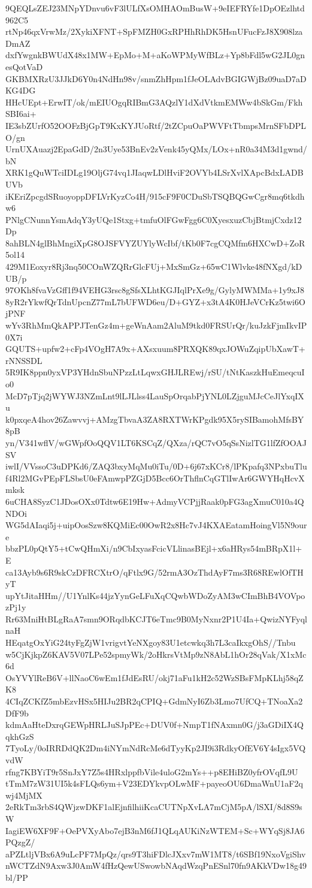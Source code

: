 9QEQLsZEJ23MNpYDnvu6vF3lULfXsOMHAOmBusW+9eIEFRYfe1DpOEzlhtd962C5
rtNp46qxVrwMz/2XykiXFNT+SpFMZH0GxRPHhRhDK5HsnUFucFzJ8X908lzaDmAZ
dxfYwgnkBWUdX48x1MW+EpMo+M+aKoWPMyWfBLz+Yp8bFdl5wG2JL0gnesQotVaD
GKBMXRzU3JJkD6Y0n4NdHn98v/snmZhHpm1fJeOLAdvBGIGWjBz09uaD7aDKG4DG
HHcUEpt+ErwIT/ok/mEIUOgqRIBmG3AQzlY1dXdVtkmEMWw4bSkGm/FkhSBI6ai+
IE3sbZUrfO52OOFzBjGpT9KxKYJUoRtf/2tZCpuOaPWVFtTbmpsMrnSFbDPLO/gn
UrnUXAuazj2EpaGdD/2n3Uye53BnEv2zVenk45yQMx/LOx+nR0a34M3d1gwnd/bN
XRK1gQuWTciIDLg19OljG74vq1JIaqwLDlHviF2OVYb4LSrXvlXApcBdxLADBUVb
iKEriZpcgdSRuoyoppDFLVrKyzCo4H/915cF9F0CDuSbTSQBQGwCgr8mq6tkdhw6
PNlgCNunnYsmAdqY3yUQe1Stxg+tmfuOlFGwFgg6C0XyesxuzCbjBtmjCxdz12Dp
8ahBLN4glBhMngiXpG8OJSFVYZUYlyWcIbf/tKb0F7cgCQMfm6HXCwD+ZoR5ol14
429M1Eoxyr8Rj3nq50COnWZQRrGlcFUj+MxSmGz+65wC1Wlvke48fNXgd/kDUB/p
97OKh8fvaVzGff1f94VEHG3rsc8gSfsXLhtKGJIqlPrXe9g/GylyMWMMa+1y9xJ8
8yR2rYkwfQrTdnUpcnZ77mL7bUFWD6eu/D+GYZ+x3tA4K0HJeVCrKz5twi6OjPNF
wYv3RhMmQkAPPJTenGz4m+geWnAam2AluM9tkd0FRSUrQr/kuJzkFjmIkvIP0X7i
GQUTS+upfw2+cFp4VOgH7A9x+AXsxuum8PRXQK89qxJOWuZqipUbXawT+rNNSSDL
5R9IK8ppn0yxVP3YHdnSbuNPzzLtLqwxGHJLREwj/rSU/tNtKaszkHuEmeqcuIo0
McD7pTjq2jWYWJ3NZmLnt9lLJLlss4LauSpOrqabPjYNL0LZjguMJcCeJlYxqIXu
k0pxqeA4hov26Zawvvj+AMzgTbvaA3ZA8RXTWrKPgdk95X5rySIBamohMfsBY8pB
yn/V341wflV/wGWpfOoQQV1LT6KSCqZ/QXza/rQC7vO5qSsNizlTG1lfZfOOAJSV
iwlI/VVssoC3uDPKd6/ZAQ3bxyMqMu0iTu/0D+6j67xKCr8/lPKpafq3NPxbuTlu
f4Rl2MGvPEpFLSbsU0eFAmwpPZGjD5Bcc6OrThflnCqGTlIwAr6GWYHqHcvXmksk
6uCHA8SyzC1JDosOXx0Tdtw6E19Hw+AdmyVCPjjRaak0pFG3agXmuC010a4QNDOi
WG5dAIaqi5j+uipOosSzw8KQMiEc00OwR2x8Hc7vJ4KXAEatamHoingVl5N9oure
bbzPL0pQtY5+tCwQHmXi/n9CbIxyasFcicVLlinasBEjl+x6aHRys54mBRpX1l+E
ca13Ayb9s6R9skCzDFRCXtrO/qFtlx9G/52rmA3OzThdAyF7ms3R68REwlOfTHyT
upYtJitaHHm//U1YnlKs44jzYynGeLFuXqCQwbWDoZyAM3wCImBhB4VOVpozPj1y
Rr63MniHtBLgRaA7smn9ORqdbKCJT6eTmc9B0MyNxnr2P1U4Ia+QwizNYFyqlnaH
HEqatgOxYiG24tyFgZjW1vrigvtYeNXgoy83U1etcwkq3h7L3caIkxgOhS//Tnbu
w5CjKjkpZ6KAV5V07LPe52spmyWk/2oHkrsVtMp9zN8AbL1hOr28qVak/X1xMc6d
OsYVYlReB6V+llNaoC6wEm1fJdEsRU/okj71aFu1kH2c52WzSBsFMpKLhj58qZK8
4CIqZCKfZ5mbEzvHSx5HIJu2BR2qCPIQ+GdmNyI6Zb3Lmo7UfCQ+TNoaXa2DfF9b
kdmAaHteDxrqGEWpHRLJuSJpPEc+DUV0f+NmpT1fNAxmn0G/j3aGDiIX4QqkhGzS
7TyoLy/0oIRRDdQK2Dm4iNYmNdRcMe6dTyyKp2JI9i3RdkyOfEV6Y4sIgx5VQvdW
rfng7KBYiT9r5SnJxY7Z5s4HRxlppfbVile4uloG2mYs++p8EHiBZ0yfrOVqfL9U
tTmM7zW31UI5k4sFLQs6ym+V23EDYkvpOLwMF+payeoOU6DmaWnU1aF2qwj4MjMX
2eRkTm3rbS4QWjzwDKF1alEjnfilhiiKcaCUTNpXvLA7mCjM5pA/lSXI/8d8S9sW
IagiEW6XF9F+OePVXyAbo7ejB3nM6fJ1QLqAUKiNzWTEM+Sc+WYqSj8JA6PQzgZ/
aPZLtljVBx6A9uLcPF7MpQz/qrs9T3hiFDlcJXxv7mW1MT8/t6SBf19NxoVgiShv
nWCTZdN9Axw3J0AmW4fHzQewUSwowbNAqdWzqPnESnl70fn9AKkVDw18g49bl/PP
